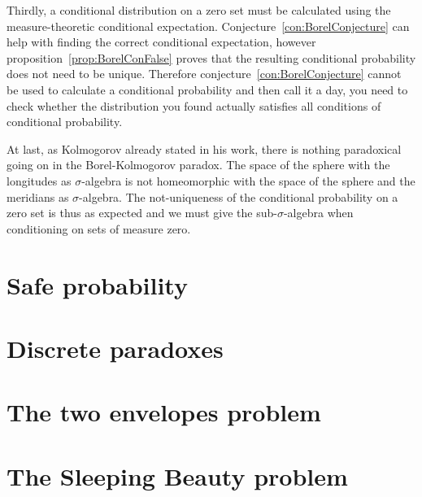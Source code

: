 \documentclass[twoside,a4paper]{report}
\theoremstyle{plain}
\theoremstyle{definition}
\theoremstyle{remark}
\numberwithin{equation}{chapter}
\DeclareMathOperator{\1}{\mathbbm{1}}
\begin{document}
Thirdly, a conditional distribution on a zero set must be calculated using the measure-theoretic conditional expectation. Conjecture~\ref{con:BorelConjecture} can help with finding the correct conditional expectation, however proposition~\ref{prop:BorelConFalse} proves that the resulting conditional probability does not need to be unique. Therefore conjecture~\ref{con:BorelConjecture} cannot be used to calculate a conditional probability and then call it a day, you need to check whether the distribution you found actually satisfies all conditions of conditional probability.

At last, as Kolmogorov \cite{Kolmogorov33} already stated in his work, there is nothing paradoxical going on in the Borel-Kolmogorov paradox. The space of the sphere with the longitudes as $\sigma$-algebra is not homeomorphic with the space of the sphere and the meridians as $\sigma$-algebra. The not-uniqueness of the conditional probability on a zero set is thus as expected and we must give the sub-$\sigma$-algebra when conditioning on sets of measure zero.


\chapter{Safe probability}\label{chap:SafeProp}

\chapter{Discrete paradoxes}\label{chap:DiscPara}

\chapter{The two envelopes problem}\label{chap:TwoEnvelope}

\chapter{The Sleeping Beauty problem}\label{chap:SleepingBeauty}




\appendix

\newpage

\printindex
\end{document}
